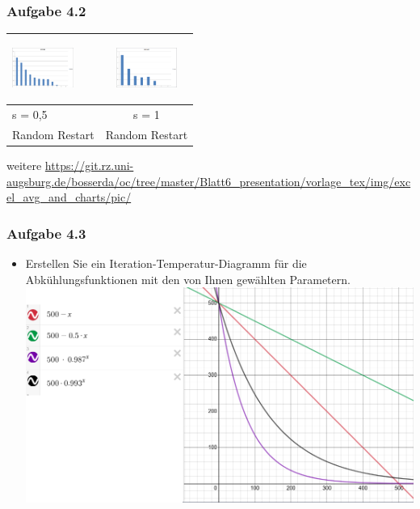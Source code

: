 \documentclass[xcolor=pdftex,dvipsnames,table]{beamer}
\begin{document}
\begin{frame}
  \frametitle{Aufgabe 4.2}
     \begin{tabular}{|l|c|} 
      \rowcolor[HTML]{CCD6CC}	
   \includegraphics[width=20mm, height=20mm]{img/excel_avg_and_charts/pic/BB1_RandomRestartHillClimbing_s_0_5.png}
 &  \includegraphics[width=20mm, height=20mm]{img/excel_avg_and_charts/pic/BB1_RandomRestartHillClimbing_s_1.png} \\ \hline
      \rowcolor[HTML]{A6BFB9} s = 0,5 & s = 1 \\ \hline
       \rowcolor[HTML]{A6BFB9} Random Restart &  Random Restart\\ \hline
    \end{tabular}
    \newline
    weitere
    \url{https://git.rz.uni-augsburg.de/bosserda/oc/tree/master/Blatt6_presentation/vorlage_tex/img/excel_avg_and_charts/pic/}
 \end{frame}

\begin{frame}
  \frametitle{Aufgabe 4.3}
  \begin{itemize}
  		\item Erstellen Sie ein Iteration-Temperatur-Diagramm für die Abkühlungsfunktionen mit den von
Ihnen gewählten Parametern.
\newline
\includegraphics[scale=0.3]{img/OC2_Blatt6_A4_3.png}
  \end{itemize}
\end{frame}
\end{document}
